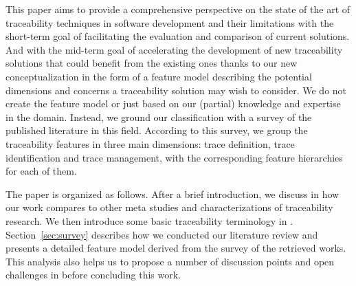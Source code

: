 This paper aims to provide a comprehensive perspective on the state of the art of traceability techniques in software development and their limitations with the short-term goal of facilitating the evaluation and comparison of current solutions. And with the mid-term goal of accelerating the development of new traceability solutions that could benefit from the existing ones thanks to our new conceptualization in the form of a feature model describing the potential dimensions and concerns a traceability solution may wish to consider.   %
We do not create the feature model or just based on our (partial) knowledge and expertise in the domain. Instead, we ground our classification with a survey of the published literature in this field. According to this survey, we group the traceability features in three main dimensions: trace definition, trace identification and trace management, with the corresponding feature hierarchies for each of them. 


The paper is organized as follows. After a brief introduction, we discuss in  how our work compares to other meta studies and characterizations of traceability research. We then introduce some basic traceability terminology in . Section~\ref{sec:survey} describes how we conducted our literature review and  presents a detailed feature model derived from the survey of the retrieved works. This analysis also helps us to propose a number of discussion points and open challenges in  before concluding this work. 

